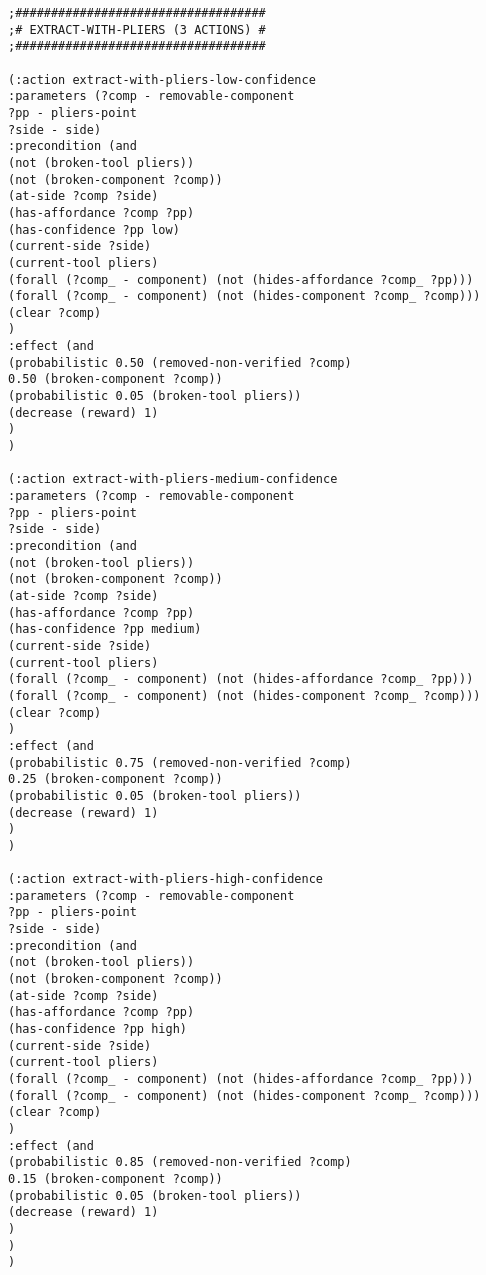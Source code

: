 \documentclass[../root.tex]{subfiles}
\begin{document}
\begin{lstlisting}
;###################################
;# EXTRACT-WITH-PLIERS (3 ACTIONS) #
;###################################

(:action extract-with-pliers-low-confidence
:parameters (?comp - removable-component
?pp - pliers-point
?side - side)
:precondition (and
(not (broken-tool pliers))
(not (broken-component ?comp))
(at-side ?comp ?side)
(has-affordance ?comp ?pp)
(has-confidence ?pp low)
(current-side ?side)
(current-tool pliers)
(forall (?comp_ - component) (not (hides-affordance ?comp_ ?pp)))
(forall (?comp_ - component) (not (hides-component ?comp_ ?comp)))
(clear ?comp)
)
:effect (and
(probabilistic 0.50 (removed-non-verified ?comp)
0.50 (broken-component ?comp))
(probabilistic 0.05 (broken-tool pliers))
(decrease (reward) 1)
)
)

(:action extract-with-pliers-medium-confidence
:parameters (?comp - removable-component
?pp - pliers-point
?side - side)
:precondition (and
(not (broken-tool pliers))
(not (broken-component ?comp))
(at-side ?comp ?side)
(has-affordance ?comp ?pp)
(has-confidence ?pp medium)
(current-side ?side)
(current-tool pliers)
(forall (?comp_ - component) (not (hides-affordance ?comp_ ?pp)))
(forall (?comp_ - component) (not (hides-component ?comp_ ?comp)))
(clear ?comp)
)
:effect (and
(probabilistic 0.75 (removed-non-verified ?comp)
0.25 (broken-component ?comp))
(probabilistic 0.05 (broken-tool pliers))
(decrease (reward) 1)
)
)

(:action extract-with-pliers-high-confidence
:parameters (?comp - removable-component
?pp - pliers-point
?side - side)
:precondition (and
(not (broken-tool pliers))
(not (broken-component ?comp))
(at-side ?comp ?side)
(has-affordance ?comp ?pp)
(has-confidence ?pp high)
(current-side ?side)
(current-tool pliers)
(forall (?comp_ - component) (not (hides-affordance ?comp_ ?pp)))
(forall (?comp_ - component) (not (hides-component ?comp_ ?comp)))
(clear ?comp)
)
:effect (and
(probabilistic 0.85 (removed-non-verified ?comp)
0.15 (broken-component ?comp))
(probabilistic 0.05 (broken-tool pliers))
(decrease (reward) 1)
)
)
)
\end{lstlisting}

\end{document}
